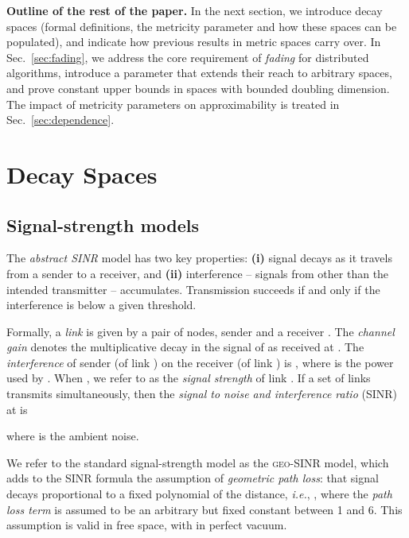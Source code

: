 \documentclass[11pt]{amsart}
\newcommand{\geomodel}{\textsc{geo-SINR}}
\newcommand{\mypara}[1]{\smallskip\noindent\textbf{#1.}}  \newcommand{\tightpara}[1]{\noindent\textbf{#1.}}  \newcommand{\inddim}{D}
\begin{document}
\iffalse

\begin{quote}
\emph{To do: Expand discussion on the validity of these assumptions}
Summary: geometric is basically always way off; additivity and
thresholding are close approximations. Cite ICDCS and others.
\end{quote}
\fi

\mypara{Outline of the rest of the paper}
In the next section, we introduce decay spaces (formal definitions, the metricity parameter and how these spaces can be populated),
and indicate how previous results in metric spaces carry over.
In Sec.~\ref{sec:fading}, we address the core requirement of \emph{fading} for distributed algorithms, introduce a parameter that extends their reach to arbitrary spaces, and prove constant upper bounds in spaces with bounded doubling dimension.
The impact of metricity parameters on approximability is treated in Sec.~\ref{sec:dependence}.

\section{Decay Spaces}
\label{sec:models}

\subsection{Signal-strength models}
\label{sec:ss}

The \emph{abstract SINR} model has two key properties:
\textbf{(i)} signal decays as it travels from a sender to a receiver,
and \textbf{(ii)} interference -- signals from other than the intended transmitter -- accumulates.
Transmission succeeds if and only if the interference is below a given threshold.

Formally, a \emph{link}  is given by a pair of
nodes, sender  and a receiver .  The \emph{channel gain}  denotes the multiplicative
decay in the signal of  as received at .  The
\emph{interference}  of sender  (of link ) on 
the receiver  (of link ) is ,
where  is the power used by .
When , we refer to  as the \emph{signal strength} of link .
If a set  of
links transmits simultaneously, then the \emph{signal to noise and
  interference ratio} (SINR) at  is

where  is the ambient noise.

We refer to the standard signal-strength model as the {\geomodel} model, which 
adds to the SINR formula the assumption of \emph{geometric path loss}:
that signal decays proportional to a fixed polynomial of the distance, 
\emph{i.e.}, 
,
 where the \emph{path loss term}  is assumed to be an
 arbitrary but fixed constant between 1 and 6.  
This assumption is valid in free space, with  in perfect vacuum.  
\end{document}
